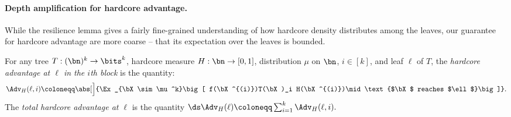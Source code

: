 \paragraph{Depth amplification for hardcore advantage.}

While the resilience lemma gives a fairly fine-grained understanding of how hardcore density distributes among the leaves, our guarantee for hardcore advantage are more coarse -- that its expectation over the leaves is bounded.

\begin{definition}
\label{def:hardcore-advantage-body}
For any tree $T:(\bn)^k \to \bits^k$, hardcore measure $H:\bn \to [0,1]$, distribution $\mu$ on $\bn$, $i\in [k]$, and leaf $\ell$ of $T$, the {\sl hardcore advantage at $\ell$ in the $i$th block} is the quantity: 
\begin{equation}
    \label{eq:hardcore-advantage}
     \Adv_H(\ell,i) \coloneqq \abs[\Big]{\Ex_{\bX\sim \mu^k}\big[ f(\bX^{(i)})T(\bX)_i H(\bX^{(i)})\mid \text{$\bX$ reaches $\ell$}\big]}.
\end{equation}
The {\sl total hardcore advantage at $\ell$} is the quantity  
$ \ds \Adv_H(\ell) \coloneqq \sum_{i=1}^k \Adv_H(\ell, i). $
\end{definition}

